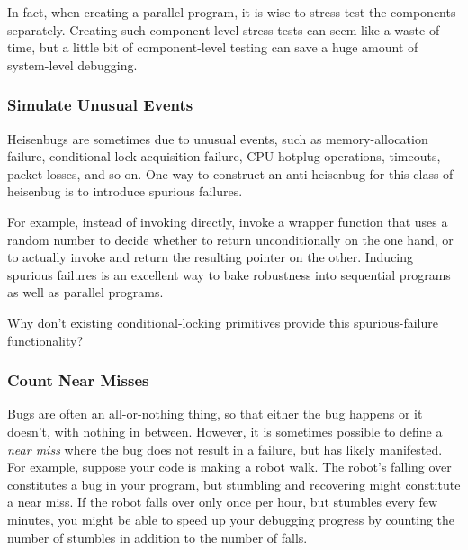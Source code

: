 In fact, when creating a parallel program, it is wise to stress-test
the components separately.
Creating such component-level stress tests can seem like a waste of time,
but a little bit of component-level testing can save a huge amount
of system-level debugging.

\subsubsection{Simulate Unusual Events}
\label{sec:debugging:Simulate Unusual Events}

Heisenbugs are sometimes due to unusual events, such as
memory-allocation failure, conditional-lock-acquisition failure,
CPU-hotplug operations, timeouts, packet losses, and so on.
One way to construct an anti-heisenbug for this class of heisenbug
is to introduce spurious failures.

For example, instead of invoking  directly, invoke
a wrapper function that uses a random number to decide whether
to return  unconditionally on the one hand, or to actually
invoke  and return the resulting pointer on the other.
Inducing spurious failures is an excellent way to bake robustness into
sequential programs as well as parallel programs.

\QuickQuiz{}
	Why don't existing conditional-locking primitives provide this
	spurious-failure functionality?
 \QuickQuizEnd

\subsubsection{Count Near Misses}
\label{sec:debugging:Count Near Misses}

Bugs are often an all-or-nothing thing, so that either the bug happens
or it doesn't, with nothing in between.
However, it is sometimes possible to define a \emph{near miss} where
the bug does not result in a failure, but has likely manifested.
For example, suppose your code is making a robot walk.
The robot's falling over constitutes a bug in your program, but
stumbling and recovering might constitute a near miss.
If the robot falls over only once per hour, but stumbles every few
minutes, you might be able to speed up your debugging progress by
counting the number of stumbles in addition to the number of falls.


